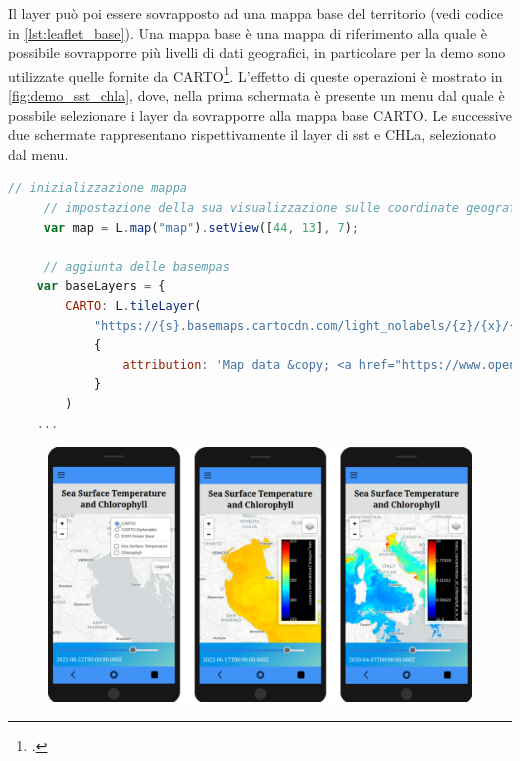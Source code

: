 \documentclass[./main.tex]{subfiles}
\begin{document}
Il layer può poi essere sovrapposto ad una mappa base del territorio (vedi codice in \autoref{lst:leaflet_base}). Una mappa base è una mappa di riferimento alla quale è possibile sovrapporre più livelli di dati geografici, in particolare per la demo sono utilizzate quelle fornite da CARTO\footcite[\url{https://carto.com/basemaps}]{website-carto}. L'effetto di queste operazioni è mostrato in \autoref{fig:demo_sst_chla}, dove, nella prima schermata è presente un menu dal quale è possbile selezionare i layer da sovrapporre alla mappa base CARTO. Le successive due schermate rappresentano rispettivamente il layer di sst e CHLa, selezionato dal menu.

\begin{lstlisting}[language=javascript, caption={Utilizzo di Leaflet per ottenere una mappa base, fornita da CARTO, per le coordinate specificate.}, label=lst:leaflet_base]
     // inizializzazione mappa
     // impostazione della sua visualizzazione sulle coordinate geografiche scelte
     var map = L.map("map").setView([44, 13], 7);

     // aggiunta delle basempas
    var baseLayers = {
        CARTO: L.tileLayer(
            "https://{s}.basemaps.cartocdn.com/light_nolabels/{z}/{x}/{y}{r}.pdf",
            {
                attribution: 'Map data &copy; <a href="https://www.openstreetmap.org/">OpenStreetMap</a> contributors, <a href="https://carto.com/attributions">CARTO</a>',
            }
        )
    ...
\end{lstlisting}

\begin{figure}[!ht]
\noindent\begin{minipage}[c]{\textwidth}
\vspace{1cm}
\includegraphics[width=\textwidth]{images/demo_sst_chla.pdf}
\captionsetup{font=small, hypcap=false}
\label{fig:demo_sst_chla}
\end{minipage}
\hspace{0.05\textwidth}
\vspace{0.25cm}
\end{figure}
\end{document}
